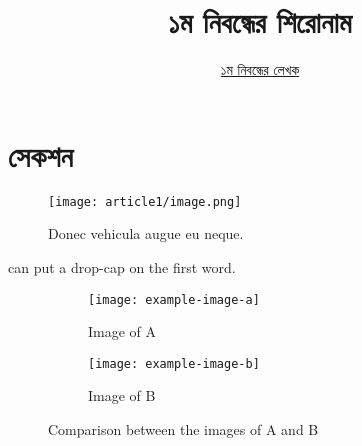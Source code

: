 \documentclass[12pt]{article}
\begin{document}

\title{১ম নিবন্ধের শিরোনাম}
\author{\href{https://github.com/rafisics/ebook-template}{১ম নিবন্ধের লেখক}}
\date{}


\section{সেকশন}

\begin{figure}[hbt!]
        \centering
        \texttt{[image: article1/image.png]}
        \caption{Donec vehicula augue eu neque.}
\end{figure}

 can put a drop-cap on the first word.
\blindtext

\begin{figure}[hbt!]
    \centering
    \begin{subfigure}[t]{0.5\textwidth}
        \centering
        \texttt{[image: example-image-a]}
        \caption{Image of A}
    \end{subfigure}%
    \begin{subfigure}[t]{0.5\textwidth}
        \centering
        \texttt{[image: example-image-b]}
        \caption{Image of B}
    \end{subfigure}
    \caption{Comparison between the images of A and B}
\end{figure}

\end{document}
